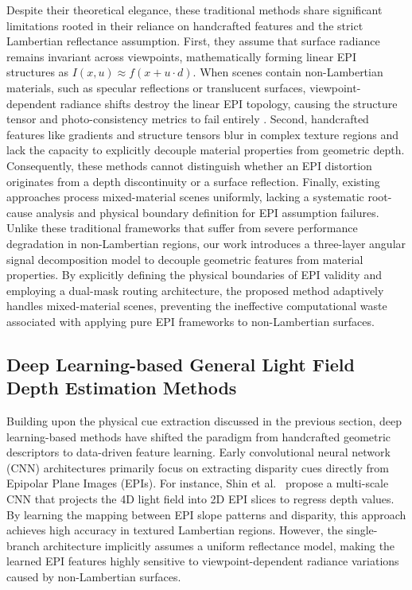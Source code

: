 \documentclass[lettersize,journal]{IEEEtran}
\begin{document}
Despite their theoretical elegance, these traditional methods share significant limitations rooted in their reliance on handcrafted features and the strict Lambertian reflectance assumption. First, they assume that surface radiance remains invariant across viewpoints, mathematically forming linear EPI structures as $I(x, u) \approx f(x + u \cdot d)$. When scenes contain non-Lambertian materials, such as specular reflections or translucent surfaces, viewpoint-dependent radiance shifts destroy the linear EPI topology, causing the structure tensor and photo-consistency metrics to fail entirely \cite{drmcolo}. Second, handcrafted features like gradients and structure tensors blur in complex texture regions and lack the capacity to explicitly decouple material properties from geometric depth. Consequently, these methods cannot distinguish whether an EPI distortion originates from a depth discontinuity or a surface reflection. Finally, existing approaches process mixed-material scenes uniformly, lacking a systematic root-cause analysis and physical boundary definition for EPI assumption failures. Unlike these traditional frameworks that suffer from severe performance degradation in non-Lambertian regions, our work introduces a three-layer angular signal decomposition model to decouple geometric features from material properties. By explicitly defining the physical boundaries of EPI validity and employing a dual-mask routing architecture, the proposed method adaptively handles mixed-material scenes, preventing the ineffective computational waste associated with applying pure EPI frameworks to non-Lambertian surfaces.

\subsection{Deep Learning-based General Light Field Depth Estimation Methods}

Building upon the physical cue extraction discussed in the previous section, deep learning-based methods have shifted the paradigm from handcrafted geometric descriptors to data-driven feature learning. Early convolutional neural network (CNN) architectures primarily focus on extracting disparity cues directly from Epipolar Plane Images (EPIs). For instance, Shin et al.~\cite{heber2018} propose a multi-scale CNN that projects the 4D light field into 2D EPI slices to regress depth values. By learning the mapping between EPI slope patterns and disparity, this approach achieves high accuracy in textured Lambertian regions. However, the single-branch architecture implicitly assumes a uniform reflectance model, making the learned EPI features highly sensitive to viewpoint-dependent radiance variations caused by non-Lambertian surfaces.
\end{document}
